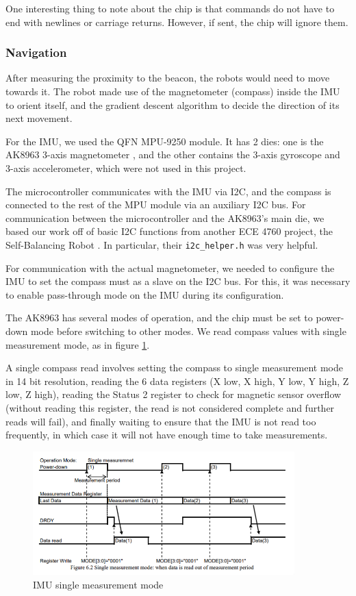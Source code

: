 \documentclass[]{article}
\begin{document}
One interesting thing to note about the chip is that commands do not have to end with newlines or carriage returns.
However, if sent, the chip will ignore them.

\subsubsection{Navigation}

After measuring the proximity to the beacon, the robots would need to move towards it. The robot made use of the magnetometer (compass) inside the IMU to orient itself, and the gradient descent algorithm to decide the direction of its next movement.

For the IMU, we used the QFN MPU-9250 \cite{mpu9250datasheet} \cite{mpu9250regmap} module. It has 2 dies: one is the AK8963 3-axis magnetometer \cite{ak8963cdatasheet}, and the other contains the 3-axis gyroscope and 3-axis accelerometer, which were not used in this project.

The microcontroller communicates with the IMU via I2C, and the compass is connected to the rest of the MPU module via an auxiliary I2C bus. For communication between the microcontroller and the AK8963's main die, we based our work off of basic I2C functions from another ECE 4760 project, the Self-Balancing Robot \cite{selfbalancingrobot}. In particular, their \texttt{i2c\_helper.h} was very helpful.

For communication with the actual magnetometer, we needed to configure the IMU to set the compass must as a slave on the I2C bus. For this, it was necessary to enable pass-through mode on the IMU during its configuration.

The AK8963 has several modes of operation, and the chip must be set to power-down mode before switching to other modes.
We read compass values with single measurement mode, as in figure \ref{fig:imu_single_measurement}.

A single compass read involves setting the compass to single measurement mode in 14 bit resolution, reading the 6 data registers (X low, X high, Y low, Y high, Z low, Z high), reading the Status 2 register to check for magnetic sensor overflow (without reading this register, the read is not considered complete and further reads will fail), and finally waiting to ensure that the IMU is not read too frequently, in which case it will not have enough time to take measurements.

\begin{figure}
  \centering
  \includegraphics[width=0.9\textwidth]{imu_single_measurement.png}
  \caption{IMU single measurement mode}
  \label{fig:imu_single_measurement}
\end{figure}
\end{document}
